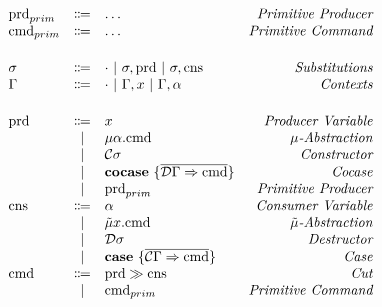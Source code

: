 \newcommand{\prd}{\text{prd}}
\newcommand{\prdprim}{\prd_{prim}}
\newcommand{\cns}{\text{cns}}
\newcommand{\cmd}{\text{cmd}}
\newcommand{\cmdprim}{\cmd_{prim}}
\newcommand{\comatch}[1]{\mathbf{cocase}\ \{ #1 \} }
\newcommand{\match}[1]{\mathbf{case}\ \{ #1 \} }

\[
  \begin{array}{lclr}
    \prdprim & \Coloneqq & \ldots & \emph{Primitive Producer} \\
    \cmdprim & \Coloneqq & \ldots & \emph{Primitive Command} \\[5mm]
    \sigma & \Coloneqq & \cdot \sep \sigma, \prd \sep \sigma, \cns & \emph{Substitutions} \\
    \Gamma & \Coloneqq & \cdot \sep \Gamma, x \sep \Gamma, \alpha & \emph{Contexts} \\[5mm]
    \prd & \Coloneqq & x & \emph{Producer Variable} \\
    & | & \mu \alpha. \cmd & \emph{$\mu$-Abstraction} \\
    & | & \mathcal{C}\sigma & \emph{Constructor} \\
    & | & \comatch{\overline{\mathcal{D}\Gamma \Rightarrow \cmd}} & \emph{Cocase} \\
    & | & \prdprim & \emph{Primitive Producer} \\
    \cns & \Coloneqq & \alpha & \emph{Consumer Variable} \\
    & | & \tilde\mu x. \cmd & \emph{$\tilde\mu$-Abstraction} \\
    & | & \mathcal{D}\sigma & \emph{Destructor} \\
    & | & \match{\overline{\mathcal{C}\Gamma \Rightarrow \cmd}} & \emph{Case} \\
    \cmd & \Coloneqq & \prd \gg \cns & \emph{Cut} \\
    & | & \cmdprim & \emph{Primitive Command} \\
  \end{array}
\]
